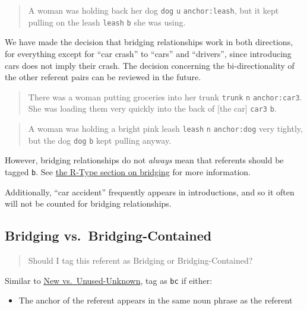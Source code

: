 \documentclass[
]{book}
\providecommand{\tightlist}{%
  \setlength{\itemsep}{0pt}\setlength{\parskip}{0pt}}
\begin{document}
\begin{quote}
A woman was holding back her dog \texttt{dog} \texttt{u} \texttt{anchor:leash},
but it kept pulling on the leash \texttt{leash} \texttt{b} she was using.
\end{quote}

We have made the decision that bridging relationships work in both directions,
for everything except for ``car crash'' to ``cars'' and ``drivers'',
since introducing cars does not imply their crash.
The decision concerning the bi-directionality of the other referent pairs can be reviewed in the future.

\begin{quote}
There was a woman putting groceries into her trunk \texttt{trunk} \texttt{n} \texttt{anchor:car3}.
She was loading them very quickly into the back of {[}the car{]} \texttt{car3} \texttt{b}.
\end{quote}

\begin{quote}
A woman was holding a bright pink leash \texttt{leash} \texttt{n} \texttt{anchor:dog} very tightly,
but the dog \texttt{dog} \texttt{b} kept pulling anyway.
\end{quote}

However, bridging relationships do not \emph{always} mean that
referents should be tagged \texttt{b}.
See \protect\hyperlink{bridging}{the R-Type section on bridging} for more information.

Additionally, ``car accident'' frequently appears in introductions,
and so it often will not be counted for bridging relationships.

\hypertarget{bridging-vs.-bridging-contained}{%
\subsection{Bridging vs.~Bridging-Contained}\label{bridging-vs.-bridging-contained}}

\begin{quote}
Should I tag this referent as Bridging or Bridging-Contained?
\end{quote}

Similar to \protect\hyperlink{new-vs.-unused-unknown}{New vs.~Unused-Unknown},
tag as \texttt{bc} if either:

\begin{itemize}
\tightlist
\item
  The anchor of the referent appears in the same noun phrase as the referent
\end{itemize}
\end{document}
